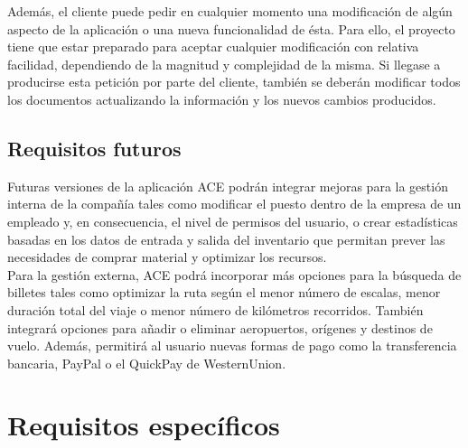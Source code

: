 \documentclass[11pt, a4paper, twoside]{report}
\begin{document}
			Además, {\color{red} el cliente puede pedir en cualquier momento una modificación de algún aspecto de la aplicación o una nueva funcionalidad de ésta}. Para ello, el proyecto tiene que estar preparado para aceptar cualquier modificación con relativa facilidad, dependiendo de la magnitud y complejidad de la misma. Si llegase a producirse esta petición por parte del cliente, también se deberán modificar todos los documentos actualizando la información y los nuevos cambios producidos.

		\subsection{Requisitos futuros}
			Futuras versiones de la aplicación ACE podrán integrar mejoras para la gestión interna de la compañía tales como modificar el puesto dentro de la empresa de un empleado y, en consecuencia, el nivel de permisos del usuario, o crear estadísticas basadas en los datos de entrada y salida del inventario que permitan prever las necesidades de comprar material y optimizar los recursos. \\
		
			Para la gestión externa, ACE podrá incorporar más opciones para la búsqueda de billetes tales como optimizar la ruta según el menor número de escalas, menor duración total del viaje o menor número de kilómetros recorridos. También integrará opciones para añadir o eliminar aeropuertos, orígenes y destinos de vuelo. Además, permitirá al usuario nuevas formas de pago como la transferencia bancaria, \gls{PayPal} o el \gls{QuickPay} de \gls{WesternUnion}.

	\section{Requisitos específicos}
\end{document}
